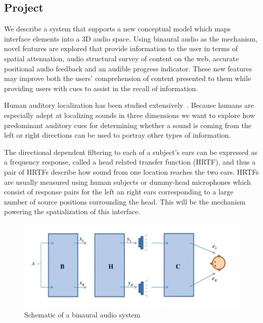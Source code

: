 \subsection{                 Project                                         }

We describe a system that supports a new conceptual model which maps interface
elements into a 3D audio space. Using binaural audio as the mechanism, novel
features are explored that provide information to the user in terms of spatial
attenuation, audio structural survey of content on the web, accurate positional
audio feedback and an audible progress indicator. These new features may improve
both the users' comprehension of content presented to them while providing users
with cues to assist in the recall of information.

Human auditory localization has been studied extensively~\cite{
yost1987directional, blauert1997spatial }. Because humans are especially adept
at localizing sounds in three dimensions we want to explore how predominant
auditory cues for determining whether a sound is coming from the left or right
directions can be used to portray other types of information.

The directional dependent filtering to each of a subject's ears can be expressed
as a frequency response, called a head related transfer function (HRTF), and
thus a pair of HRTFs describe how sound from one location reaches the two ears.
HRTFs are usually measured using human subjects or dummy-head microphones which
consist of response pairs for the left an right ears corresponding to a large
number of source positions surrounding the head. This will be the mechanism
powering the spatialization of this interface.

\begin{figure}[h]
  \centering
  \includegraphics[width=1\textwidth]{images/binaural_diagram.jpg}
  \caption{Schematic of a binaural audio system}
\end{figure}

